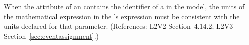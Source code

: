When the  attribute of an \EventAssignment
contains the identifier of a \Parameter in the model, the
units of the mathematical expression in the
\EventAssignment's  expression must be
consistent with the units declared for that parameter.
(References: L2V2 Section~4.14.2; L2V3 Section~\ref{sec:eventassignment}.)
